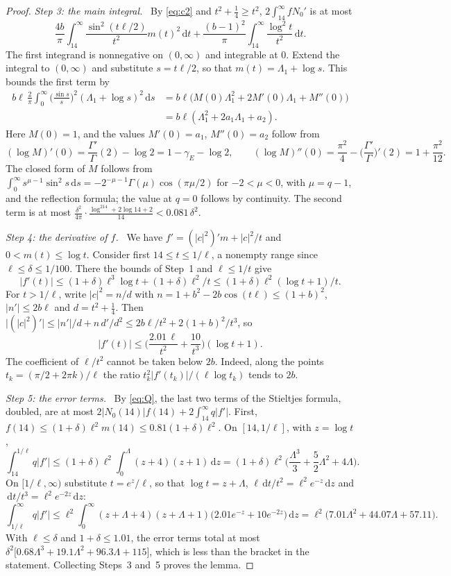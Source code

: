 \documentclass[11pt]{amsart}
\theoremstyle{remark}
\newcommand{\dd}{\,\mathrm{d}}
\newcommand{\step}[1]{\smallskip\noindent\textit{#1.}\ }
\begin{document}
\begin{proof}
\step{Step 3: the main integral} By \eqref{eq:c2} and $t^2+\frac14\ge t^2$, $2\int_{14}^\infty fN_0'$ is at most
\[
\frac{4b}\pi\int_{14}^\infty\frac{\sin^2(t\ell/2)}{t^2}m(t)^2\dd t+\frac{(b-1)^2}\pi\int_{14}^\infty\frac{\log^2t}{t^2}\dd t .
\]
The first integrand is nonnegative on $(0,\infty)$ and integrable at $0$. Extend the integral to $(0,\infty)$ and substitute $s=t\ell/2$, so that $m(t)=\Lambda_1+\log s$. This bounds the first term by
\begin{align*}
b\ell\,\frac2\pi\int_0^\infty\Big(\frac{\sin s}s\Big)^2(\Lambda_1+\log s)^2\dd s&=b\ell\big(M(0)\Lambda_1^2+2M'(0)\Lambda_1+M''(0)\big)\\
&=b\ell(\Lambda_1^2+2a_1\Lambda_1+a_2).
\end{align*}
Here $M(0)=1$, and the values $M'(0)=a_1$, $M''(0)=a_2$ follow from
\[
(\log M)'(0)=\frac{\Gamma'}{\Gamma}(2)-\log2=1-\gamma_E-\log2,\qquad (\log M)''(0)=\frac{\pi^2}4-\Big(\frac{\Gamma'}{\Gamma}\Big)'(2)=1+\frac{\pi^2}{12}.
\]
The closed form of $M$ follows from $\int_0^\infty s^{\mu-1}\sin^2s\dd s=-2^{-\mu-1}\Gamma(\mu)\cos(\pi\mu/2)$ for $-2<\mu<0$, with $\mu=q-1$, and the reflection formula; the value at $q=0$ follows by continuity. The second term is at most $\frac{\delta^2}{4\pi}\cdot\frac{\log^214+2\log14+2}{14}<0.081\,\delta^2$.

\step{Step 4: the derivative of $f$} We have $f'=(|c|^2)'m+|c|^2/t$ and $0<m(t)\le\log t$. Consider first $14\le t\le1/\ell$, a nonempty range since $\ell\le\delta\le1/100$. There the bounds of Step~1 and $\ell\le1/t$ give
\[
|f'(t)|\le(1+\delta)\ell^3\log t+(1+\delta)\ell^2/t\le(1+\delta)\ell^2(\log t+1)/t .
\]
For $t>1/\ell$, write $|c|^2=n/d$ with $n=1+b^2-2b\cos(t\ell)\le(1+b)^2$, $|n'|\le2b\ell$ and $d=t^2+\frac14$. Then $\big|(|c|^2)'\big|\le|n'|/d+n\,d'/d^2\le2b\ell/t^2+2(1+b)^2/t^3$, so
\[
|f'(t)|\le\Big(\frac{2.01\,\ell}{t^2}+\frac{10}{t^3}\Big)(\log t+1).
\]
The coefficient of $\ell/t^2$ cannot be taken below $2b$. Indeed, along the points $t_k=(\pi/2+2\pi k)/\ell$ the ratio $t_k^2|f'(t_k)|/(\ell\log t_k)$ tends to $2b$.

\step{Step 5: the error terms} By \eqref{eq:Q}, the last two terms of the Stieltjes formula, doubled, are at most $2|N_0(14)|f(14)+2\int_{14}^\infty q|f'|$. First, $f(14)\le(1+\delta)\ell^2m(14)\le0.81(1+\delta)\ell^2$. On $[14,1/\ell]$, with $z=\log t$,
\[
\int_{14}^{1/\ell}q|f'|\le(1+\delta)\ell^2\int_0^\Lambda(z+4)(z+1)\dd z=(1+\delta)\ell^2\Big(\frac{\Lambda^3}3+\frac52\Lambda^2+4\Lambda\Big).
\]
On $[1/\ell,\infty)$ substitute $t=e^z/\ell$, so that $\log t=z+\Lambda$, $\ell\dd t/t^2=\ell^2e^{-z}\dd z$ and $\dd t/t^3=\ell^2e^{-2z}\dd z$:
\[
\int_{1/\ell}^\infty q|f'|\le\ell^2\int_0^\infty(z+\Lambda+4)(z+\Lambda+1)\big(2.01e^{-z}+10e^{-2z}\big)\dd z=\ell^2\big(7.01\Lambda^2+44.07\Lambda+57.11\big).
\]
With $\ell\le\delta$ and $1+\delta\le1.01$, the error terms total at most $\delta^2\big[0.68\Lambda^3+19.1\Lambda^2+96.3\Lambda+115\big]$, which is less than the bracket in the statement. Collecting Steps~3 and~5 proves the lemma.
\end{proof}
\end{document}
